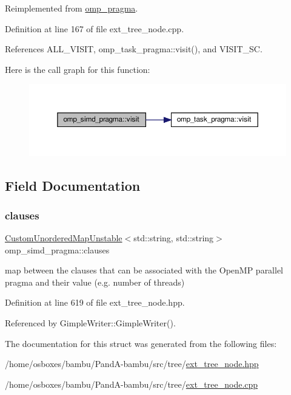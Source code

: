 Reimplemented from \hyperlink{structomp__pragma_a2e2c445528b7e097ae76fa618a9970b5}{omp\+\_\+pragma}.



Definition at line 167 of file ext\+\_\+tree\+\_\+node.\+cpp.



References A\+L\+L\+\_\+\+V\+I\+S\+IT, omp\+\_\+task\+\_\+pragma\+::visit(), and V\+I\+S\+I\+T\+\_\+\+SC.

Here is the call graph for this function\+:
\nopagebreak
\begin{figure}[H]
\begin{center}
\leavevmode
\includegraphics[width=350pt]{d4/d43/structomp__simd__pragma_aea58522f1cbf5637c63588430acf77f2_cgraph}
\end{center}
\end{figure}


\subsection{Field Documentation}
\mbox{\label{structomp__simd__pragma_a268b6c71799005c9dfb291f480d601c7}} 
\subsubsection{\texorpdfstring{clauses}{clauses}}
{\footnotesize\ttfamily \hyperlink{custom__map_8hpp_a8cbaceffc09790a885ec7e9c17809c69}{Custom\+Unordered\+Map\+Unstable}$<$std\+::string, std\+::string$>$ omp\+\_\+simd\+\_\+pragma\+::clauses}



map between the clauses that can be associated with the Open\+MP parallel pragma and their value (e.\+g. number of threads) 



Definition at line 619 of file ext\+\_\+tree\+\_\+node.\+hpp.



Referenced by Gimple\+Writer\+::\+Gimple\+Writer().



The documentation for this struct was generated from the following files\+:\begin{DoxyCompactItemize}
\item 
/home/osboxes/bambu/\+Pand\+A-\/bambu/src/tree/\hyperlink{ext__tree__node_8hpp}{ext\+\_\+tree\+\_\+node.\+hpp}\item 
/home/osboxes/bambu/\+Pand\+A-\/bambu/src/tree/\hyperlink{ext__tree__node_8cpp}{ext\+\_\+tree\+\_\+node.\+cpp}\end{DoxyCompactItemize}
